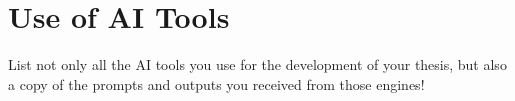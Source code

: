 \section*{Use of AI Tools}
\raggedright

List not only all the AI tools you use for the development of your thesis, but also a copy of the prompts and outputs you received from those engines!
